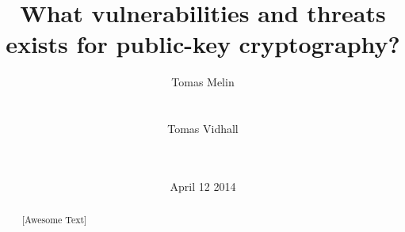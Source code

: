 \documentclass{acm_proc_article-sp}
\begin{document}
\title{What vulnerabilities and threats exists for public-key cryptography?}
\author{
\alignauthor
Tomas Melin\\
        \\
        \\
\alignauthor
Tomas Vidhall\\
        \\
        \\
}
\date{April 12 2014}
%   
%

\maketitle
\begin{abstract}
[Awesome Text]
\end{abstract}


\end{document}
